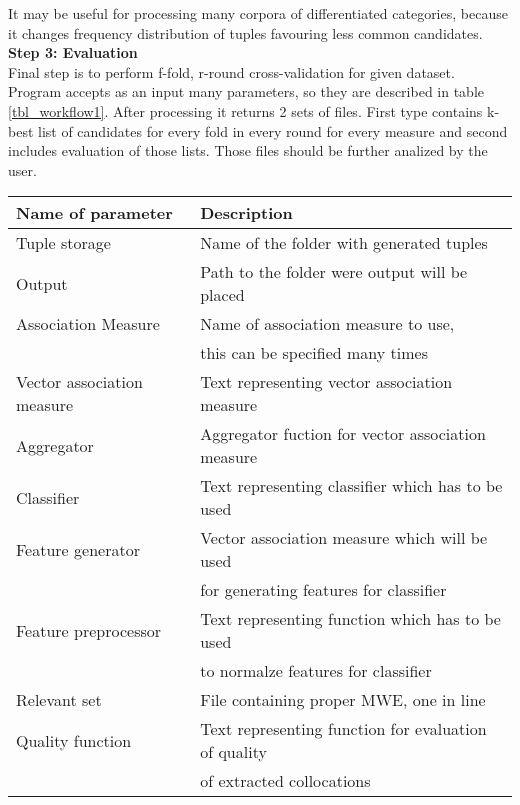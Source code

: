 It may be useful for processing many corpora of differentiated categories, because it changes frequency distribution of tuples 
favouring less common candidates.
\\ \textbf{Step 3: Evaluation}\\
Final step is to perform f-fold, r-round cross-validation for given dataset. Program accepts as an input many parameters, 
so they are described in table \ref{tbl_workflow1}. After processing it returns 2 sets of files. First type contains k-best list 
of candidates for every fold in every round for every measure and second includes evaluation of those lists. 
Those files should be further analized by the user. 

\begin{table}[t]
    \centering
    \begin{tabular*}{\textwidth}{|l @{\extracolsep{\fill}} l|}
        \hline 
        \textbf{Name of parameter} & \textbf{Description} \\
        \hline
        Tuple storage & Name of the folder with generated tuples \\
        \hline
        Output & Path to the folder were output will be placed \\
        \hline
        Association Measure & Name of association measure to use, \\& this can be specified many times \\
        \hline
        Vector association measure & Text representing vector association measure \\
        \hline
        Aggregator & Aggregator fuction for vector association measure \\
        \hline
        Classifier & Text representing classifier which has to be used \\
        \hline
        Feature generator & Vector association measure which will be used \\& for generating features for classifier \\
        \hline
        Feature preprocessor & Text representing function which has to be used \\& to normalze features for classifier \\
        \hline
        Relevant set & File containing proper MWE, one in line \\
        \hline
        Quality function & Text representing function for evaluation of quality \\& of extracted collocations \\

\end{tabular*}
\end{table}
